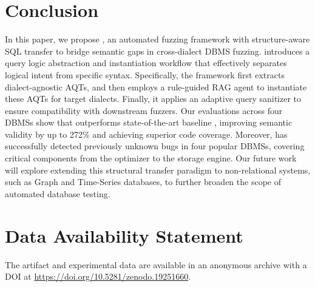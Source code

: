 \documentclass[sigconf,review,anonymous]{acmart}
\begin{document}
\section{Conclusion}
\label{sec:conclusion}
In this paper, we propose \tool{}, an automated fuzzing framework with structure-aware SQL transfer to bridge semantic gaps in cross-dialect DBMS fuzzing. 
\tool{} introduces a query logic abstraction and instantiation workflow that effectively separates logical intent from specific syntax. 
Specifically, the framework first extracts dialect-agnostic AQTs, and then employs a rule-guided RAG agent to instantiate these AQTs for target dialects. 
Finally, it applies an adaptive query sanitizer to ensure compatibility with downstream fuzzers. 
Our evaluations across four DBMSs show that \tool{} outperforms state-of-the-art baseline \sedar{}, improving semantic validity by up to 272\% and achieving superior code coverage. Moreover, \tool{} has successfully detected \bugcnt{} previously unknown bugs in four popular DBMSs, covering critical components from the optimizer to the storage engine. Our future work will explore extending this structural transfer paradigm to non-relational systems, such as Graph and Time-Series databases, to further broaden the scope of automated database testing.

\section{Data Availability Statement}
The artifact and experimental data are available in an anonymous archive with a DOI at
\url{https://doi.org/10.5281/zenodo.19251660}. 



 
\end{document}
